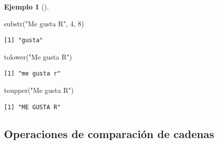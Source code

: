 \documentclass[
  a4paper,
]{scrreport}
\newenvironment{Shaded}{\begin{snugshade}}{\end{snugshade}}
\newcommand{\DecValTok}[1]{\textcolor[rgb]{0.68,0.00,0.00}{#1}}
\newcommand{\FunctionTok}[1]{\textcolor[rgb]{0.28,0.35,0.67}{#1}}
\newcommand{\NormalTok}[1]{\textcolor[rgb]{0.00,0.23,0.31}{#1}}
\newcommand{\StringTok}[1]{\textcolor[rgb]{0.13,0.47,0.30}{#1}}
\theoremstyle{definition}
\theoremstyle{definition}
\newtheorem{example}{Ejemplo}[chapter]
\theoremstyle{remark}
\begin{document}
\begin{example}[]
\begin{Shaded}
\begin{Highlighting}[]
\FunctionTok{substr}\NormalTok{(}\StringTok{"Me gusta R"}\NormalTok{, }\DecValTok{4}\NormalTok{, }\DecValTok{8}\NormalTok{)}
\end{Highlighting}
\end{Shaded}

\begin{verbatim}
[1] "gusta"
\end{verbatim}

\begin{Shaded}
\begin{Highlighting}[]
\FunctionTok{tolower}\NormalTok{(}\StringTok{"Me gusta R"}\NormalTok{)}
\end{Highlighting}
\end{Shaded}

\begin{verbatim}
[1] "me gusta r"
\end{verbatim}

\begin{Shaded}
\begin{Highlighting}[]
\FunctionTok{toupper}\NormalTok{(}\StringTok{"Me gusta R"}\NormalTok{)}
\end{Highlighting}
\end{Shaded}

\begin{verbatim}
[1] "ME GUSTA R"
\end{verbatim}

\end{example}

\hypertarget{operaciones-de-comparaciuxf3n-de-cadenas}{%
\subsection{Operaciones de comparación de
cadenas}\label{operaciones-de-comparaciuxf3n-de-cadenas}}
\end{document}
